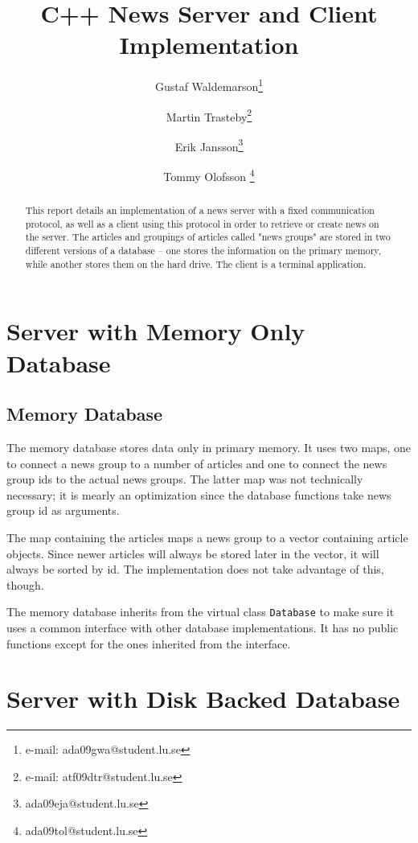 \documentclass{acmsiggraph}               %
\title{C++ News Server and Client Implementation}
\author{Gustaf Waldemarson\thanks{e-mail: ada09gwa@student.lu.se}
\and Martin Trasteby\thanks{e-mail: atf09dtr@student.lu.se}
\and Erik Jansson\thanks{ada09eja@student.lu.se}
\and Tommy Olofsson \thanks{ada09tol@student.lu.se}}
\affiliation{Faculty of Engineering (LTH), Lund University \\ Sweden}
\begin{document}
\ifpdf
\else
\fi




\begin{abstract}
This report details an implementation of a news server with a fixed
communication protocol, as well as a client using this protocol in
order to retrieve or create news on the server. The articles and
groupings of articles called "news groups" are stored in two different
versions of a database -- one stores the information on the primary
memory, while another stores them on the hard drive. The client is a
terminal application.

\end{abstract}
\keywordlist

\section{Server with Memory Only Database}
\label{sec:smemdb}

\subsection{Memory Database}
\label{ssec:mem_db}
The memory database stores data only in primary memory. It uses two maps, one to connect a news group
to a number of articles and one to connect the news group ids to the actual news groups. The latter
map was not technically necessary; it is mearly an optimization since the database functions take
news group id as arguments. 

The map containing the articles maps a news group to a vector containing article objects. Since newer
articles will always be stored later in the vector, it will always be sorted by id. The
implementation does not take advantage of this, though. 

The memory database inherits from the virtual class \texttt{Database} to make sure it uses a common 
interface with other database implementations. It has no public functions except for the ones inherited
from the interface.


\section{Server with Disk Backed Database}
\label{sec:sdiskdb}
\end{document}
